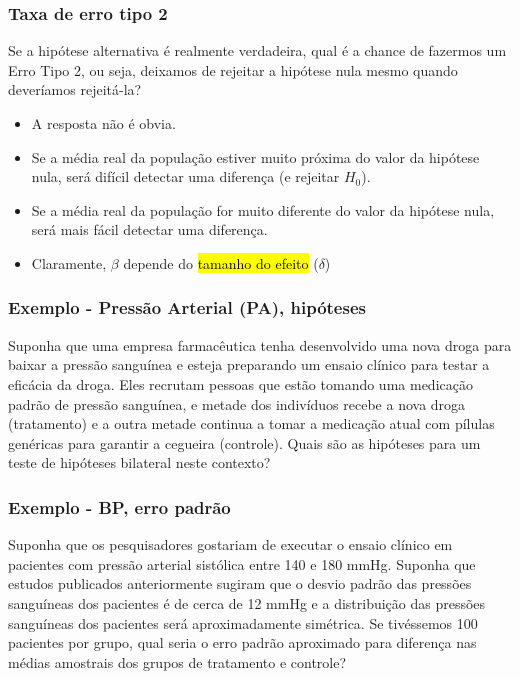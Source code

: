 \begin{frame}
\frametitle{Taxa de erro tipo 2}
\justifying
Se a hipótese alternativa é realmente verdadeira, qual é a chance de fazermos um Erro Tipo 2, ou seja, deixamos de rejeitar a hipótese nula mesmo quando deveríamos rejeitá-la?

\begin{itemize}
\justifying
\item A resposta não é obvia.
\justifying
\item Se a média real da população estiver muito próxima do valor da hipótese nula, será difícil detectar uma diferença (e rejeitar $ H_0 $).
\justifying
\item Se a média real da população for muito diferente do valor da hipótese nula, será mais fácil detectar uma diferença.
\justifying
\item Claramente, $\beta$ depende do \hl{tamanho do efeito} ($\delta$)
\end{itemize}

\end{frame}


\begin{frame}
\frametitle{Exemplo - Pressão Arterial (PA), hipóteses}
\justifying
{\dq
{\footnotesize
Suponha que uma empresa farmacêutica tenha desenvolvido uma nova droga para baixar a pressão sanguínea e esteja preparando um ensaio clínico para testar a eficácia da droga. Eles recrutam pessoas que estão tomando uma medicação padrão de pressão sanguínea, e metade dos indivíduos recebe a nova droga (tratamento) e a outra metade continua a tomar a medicação atual com pílulas genéricas para garantir a cegueira (controle). Quais são as hipóteses para um teste de hipóteses bilateral neste contexto?
}
}

\pause


\end{frame}


\begin{frame}
\frametitle{Exemplo - BP, erro padrão}
\justifying
{\dq
{\footnotesize
Suponha que os pesquisadores gostariam de executar o ensaio clínico em pacientes com pressão arterial sistólica entre 140 e 180 mmHg. Suponha que estudos publicados anteriormente sugiram que o desvio padrão das pressões sanguíneas dos pacientes é de cerca de 12 mmHg e a distribuição das pressões sanguíneas dos pacientes será aproximadamente simétrica. Se tivéssemos 100 pacientes por grupo, qual seria o erro padrão aproximado para diferença nas médias amostrais dos grupos de tratamento e controle?
}
}

\pause

\soln{
\[ SE = \sqrt{ \frac{12^2}{100} + \frac{12^2}{100} } = 1.70 \]
}

\end{frame}

